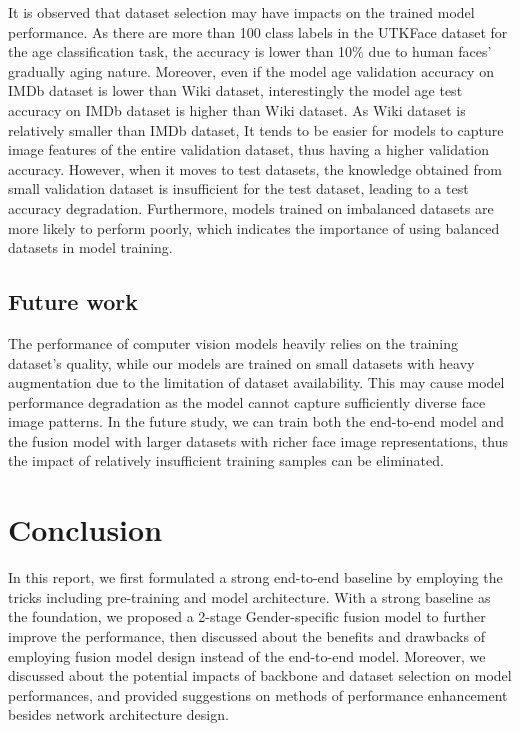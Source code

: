 \documentclass[DIV=calc, paper=a4, fontsize=10pt, twocolumn]{article}
\begin{document}
	It is observed that dataset selection may have impacts on the trained model performance. As there are more than 100 class labels in the UTKFace dataset for the age classification task, the accuracy is lower than 10\% due to human faces' gradually aging nature. Moreover, even if the model age validation accuracy on IMDb dataset is lower than Wiki dataset, interestingly the model age test accuracy on IMDb dataset is higher than Wiki dataset. As Wiki dataset is relatively smaller than IMDb dataset, It tends to be easier for models to capture image features of the entire validation dataset, thus having a higher validation accuracy. However, when it moves to test datasets, the knowledge obtained from small validation dataset is insufficient for the test dataset, leading to a test accuracy degradation. Furthermore, models trained on imbalanced datasets are more likely to perform poorly, which indicates the importance of using balanced datasets in model training.

	\subsection{Future work}

	The performance of computer vision models heavily relies on the training dataset's quality, while our models are trained on small datasets with heavy augmentation due to the limitation of dataset availability. This may cause model performance degradation as the model cannot capture sufficiently diverse face image patterns. In the future study, we can train both the end-to-end model and the fusion model with larger datasets with richer face image representations, thus the impact of relatively insufficient training samples can be eliminated.

	\section{Conclusion}
	In this report, we first formulated a strong end-to-end baseline by employing the tricks including pre-training and model architecture. With a strong baseline as the foundation, we proposed a 2-stage Gender-specific fusion model to further improve the performance, then discussed about the benefits and drawbacks of employing fusion model design instead of the end-to-end model. Moreover, we discussed about the potential impacts of backbone and dataset selection on model performances, and provided suggestions on methods of performance enhancement besides network architecture design.
	\clearpage
	
	
	
\end{document}
